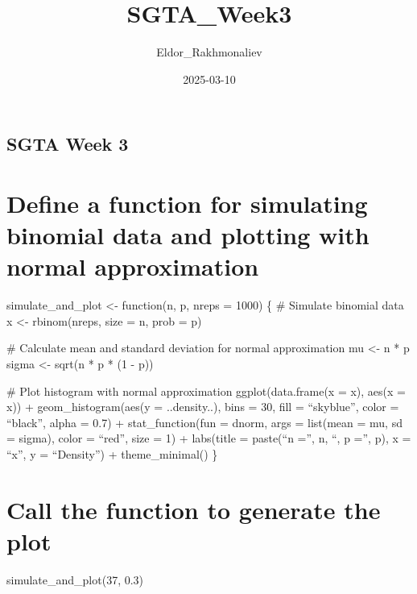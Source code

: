\documentclass[
]{article}
\title{SGTA\_Week3}
\author{Eldor\_Rakhmonaliev}
\date{2025-03-10}
\begin{document}
\maketitle

\subsection{SGTA Week 3}\label{sgta-week-3}

\section{Define a function for simulating binomial data and plotting
with normal
approximation}\label{define-a-function-for-simulating-binomial-data-and-plotting-with-normal-approximation}

simulate\_and\_plot \textless- function(n, p, nreps = 1000) \{ \#
Simulate binomial data x \textless- rbinom(nreps, size = n, prob = p)

\# Calculate mean and standard deviation for normal approximation mu
\textless- n * p sigma \textless- sqrt(n * p * (1 - p))

\# Plot histogram with normal approximation ggplot(data.frame(x = x),
aes(x = x)) + geom\_histogram(aes(y = ..density..), bins = 30, fill =
``skyblue'', color = ``black'', alpha = 0.7) + stat\_function(fun =
dnorm, args = list(mean = mu, sd = sigma), color = ``red'', size = 1) +
labs(title = paste(``n ='', n, ``, p ='', p), x = ``x'', y =
``Density'') + theme\_minimal() \}

\section{Call the function to generate the
plot}\label{call-the-function-to-generate-the-plot}

simulate\_and\_plot(37, 0.3)
\end{document}
